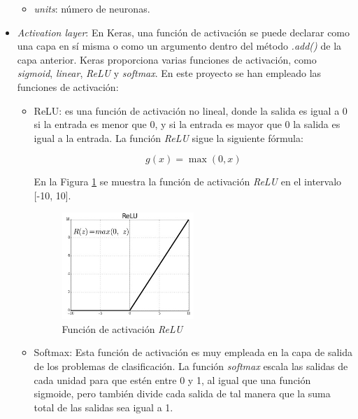 \begin{itemize}
        \begin{itemize}
            \item \textit{units}: número de neuronas.
        \end{itemize}
    
    \item \textit{Activation layer}: En Keras, una función de activación se puede declarar como una capa en sí misma o como un argumento dentro del método \textit{.add()} de la capa anterior. Keras proporciona varias funciones de activación, como \textit{sigmoid}, \textit{linear}, \textit{ReLU} y \textit{softmax}. En este proyecto se han empleado las funciones de activación:
    
        \begin{itemize}
            \item ReLU: es una función de activación no lineal, donde la salida es igual a 0 si la entrada es menor que 0, y si la entrada es mayor que 0 la salida es igual a la entrada. La función \textit{ReLU} sigue la siguiente fórmula:
            
            \begin{equation}\label{eq:relu}
		        g(x)=\max(0,x)
            \end{equation}
            
            En la Figura \ref{fig.relu} se muestra la función de activación \textit{ReLU} en el intervalo [-10, 10].
            
            \begin{figure}[H]
              \begin{center}
                \includegraphics[width=0.5\textwidth]{figures/Estado_arte/relu.png}
            		\caption{Función de activación \textit{ReLU}}
            		\label{fig.relu}
            		\end{center}
            \end{figure}
                        
            \item Softmax: Esta función de activación es muy empleada en la capa de salida de los problemas de clasificación. La función \textit{softmax} escala las salidas de cada unidad para que estén entre 0 y 1, al igual que una función sigmoide, pero también divide cada salida de tal manera que la suma total de las salidas sea igual a 1.\\
            

\end{itemize}
\end{itemize}
